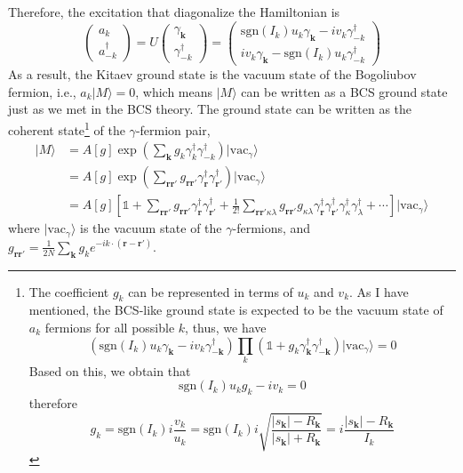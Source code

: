 \documentclass[12font]{article}
\theoremstyle{definition}
\newcommand{\vac}{\mrm{vac}}
\newcommand{\ket}[1]{| #1 \rangle}
\newcommand{\lr}[1]{\left(  #1  \right)}
\newcommand{\lrm}[1]{\left[  #1  \right]}
\newcommand{\abs}[1]{\left|  #1  \right|}
\newcommand{\mrm}[1]{\mathrm{#1}}
\newcommand{\bo}[1]{\mathbf{#1}}
\begin{document}
Therefore, the excitation that diagonalize the Hamiltonian is 
\begin{equation}\label{Bogo.e}
\begin{pmatrix}
    a_k \\
    a_{-k}^\dagger 
  \end{pmatrix} = U\begin{pmatrix}
                     \gamma_{\bo{k}} \\
                     \gamma^\dagger_{-k} 
                   \end{pmatrix} = \begin{pmatrix}
                                     \mrm{sgn}(I_k) u_k\gamma_{\bo{k}} - iv_k\gamma^\dagger_{-k} \\
                                     i v_k\gamma_{\bo{k}} - \mrm{sgn}(I_k) u_k\gamma^\dagger_{-k} 
                                   \end{pmatrix}
\end{equation}
As a result, the Kitaev ground state is the vacuum state of the Bogoliubov fermion, i.e., $a_{k}\ket{M} = 0$, which means $\ket{M}$ can be written as a BCS ground state just as we met in the BCS theory. The ground state can be written as the coherent state\footnote{
The coefficient $g_k$ can be represented in terms of $u_k$ and $v_k$. As I have mentioned, the BCS-like ground state is expected to be the vacuum state of $a_k$ fermions for all possible $k$, thus, we have
\[
\lr{\mrm{sgn}(I_k) u_k\gamma_{\bo{k}} - iv_k\gamma_{-\bo{k}}^\dagger}\prod_{k}\lr{\mathds{1} + g_k\gamma_{\bo{k}}^\dagger \gamma_{-\bo{k}}^\dagger}\ket{\vac_\gamma} = 0
\]
Based on this, we obtain that 
\[\mrm{sgn}(I_k) u_kg_k - iv_k = 0\]
therefore
\begin{equation}\label{g_k solution.e}
  g_k = \mrm{sgn}(I_k)i\frac{v_k}{u_k} = \mrm{sgn}(I_k) i\sqrt{\frac{\abs{s_{\bo{k}}} - R_{\bo{k}}}{\abs{s_{\bo{k}}} + R_{\bo{k}}}} = i\frac{\abs{s_{\bo{k}}} - R_{\bo{k}}}{I_k}
\end{equation}
} of the $\gamma$-fermion pair,
\begin{align*}
  \ket{M} &= A\lrm{g}\exp\lr{\sum_{\bo{k}}g_k \gamma^\dagger_k \gamma^\dagger_{-k}}\ket{\vac_\gamma}\\
   &= A\lrm{g}\exp\lr{\sum_{{\bo{r}}{\bo{r}'}}g_{{\bo{r}}{\bo{r}'}} \gamma^\dagger_{\bo{r}} \gamma^\dagger_{{\bo{r}'}}}\ket{\vac_\gamma}\\
   &= A\lrm{g}\lrm{\mathds{1} + \sum_{{\bo{r}}{\bo{r}'}}g_{{\bo{r}}{\bo{r}'}} \gamma^\dagger_{\bo{r}} \gamma^\dagger_{{\bo{r}'}} + \frac{1}{2!}\sum_{{\bo{r}}{\bo{r}'}\kappa\lambda}g_{{\bo{r}}{\bo{r}'}}g_{\kappa\lambda
   } \gamma^\dagger_{\bo{r}} \gamma^\dagger_{{\bo{r}'}}\gamma^\dagger_\kappa \gamma^\dagger_{\lambda} + \cdots}\ket{\vac_\gamma}
\end{align*}
where $\ket{\vac_\gamma}$ is the vacuum state of the $\gamma$-fermions, and $g_{{\bo{r}}{\bo{r}'}} = \frac{1}{2N}\sum_{\bo{k}}g_ke^{-ik\cdot(\bo{r}-\bo{r}')}$. 
\end{document}
